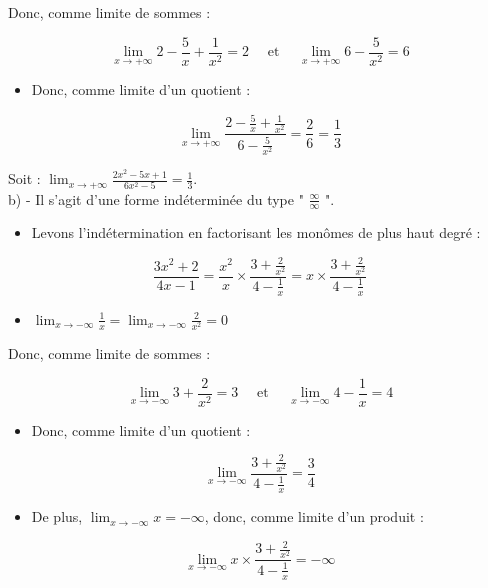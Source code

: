 \documentclass[10pt]{article}
\begin{document}
Donc, comme limite de sommes :

$$
\lim _{x \rightarrow+\infty} 2-\frac{5}{x}+\frac{1}{x^{2}}=2 \quad \text { et } \quad \lim _{x \rightarrow+\infty} 6-\frac{5}{x^{2}}=6
$$

\begin{itemize}
  \item Donc, comme limite d'un quotient :
\end{itemize}

$$
\lim _{x \rightarrow+\infty} \frac{2-\frac{5}{x}+\frac{1}{x^{2}}}{6-\frac{5}{x^{2}}}=\frac{2}{6}=\frac{1}{3}
$$

Soit : $\lim _{x \rightarrow+\infty} \frac{2 x^{2}-5 x+1}{6 x^{2}-5}=\frac{1}{3}$.\\
b) - Il s'agit d'une forme indéterminée du type " $\frac{\infty}{\infty}$ ".

\begin{itemize}
  \item Levons l'indétermination en factorisant les monômes de plus haut degré :
\end{itemize}

$$
\frac{3 x^{2}+2}{4 x-1}=\frac{x^{2}}{x} \times \frac{3+\frac{2}{x^{2}}}{4-\frac{1}{x}}=x \times \frac{3+\frac{2}{x^{2}}}{4-\frac{1}{x}}
$$

\begin{itemize}
  \item $\lim _{x \rightarrow-\infty} \frac{1}{x}=\lim _{x \rightarrow-\infty} \frac{2}{x^{2}}=0$
\end{itemize}

Donc, comme limite de sommes :

$$
\lim _{x \rightarrow-\infty} 3+\frac{2}{x^{2}}=3 \quad \text { et } \quad \lim _{x \rightarrow-\infty} 4-\frac{1}{x}=4
$$

\begin{itemize}
  \item Donc, comme limite d'un quotient :
\end{itemize}

$$
\lim _{x \rightarrow-\infty} \frac{3+\frac{2}{x^{2}}}{4-\frac{1}{x}}=\frac{3}{4}
$$

\begin{itemize}
  \item De plus, $\lim _{x \rightarrow-\infty} x=-\infty$, donc, comme limite d'un produit :
\end{itemize}

$$
\lim _{x \rightarrow-\infty} x \times \frac{3+\frac{2}{x^{2}}}{4-\frac{1}{x}}=-\infty
$$
\end{document}

